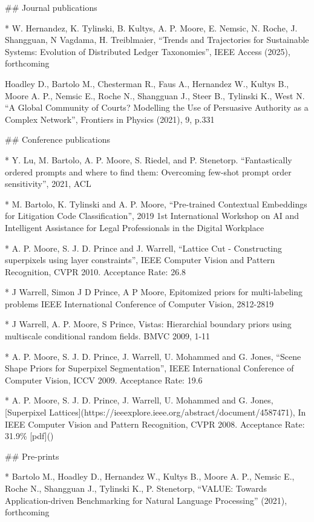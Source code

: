 
## Journal publications 

* W. Hernandez, K. Tylinski, B. Kultys, A. P. Moore,  E. Nemsic,  N. Roche, J. Shangguan, N Vagdama, H. Treiblmaier,  “Trends and Trajectories for Sustainable Systems: Evolution of Distributed Ledger Taxonomies”, IEEE Access (2025), forthcoming

Hoadley D., Bartolo M., Chesterman R., Faus A., Hernandez W., Kultys B., Moore A. P., Nemsic E., Roche N., Shangguan J., Steer B., Tylinski K., West N. “A Global Community of Courts? Modelling the Use of Persuasive Authority as a Complex Network”, Frontiers in Physics (2021), 9, p.331 

## Conference publications 

* Y. Lu, M. Bartolo, A. P. Moore, S. Riedel, and P. Stenetorp. “Fantastically ordered prompts and where to find them: Overcoming few-shot prompt order sensitivity”, 2021, ACL

* M. Bartolo, K. Tylinski and A. P. Moore, “Pre-trained Contextual Embeddings for Litigation Code Classification”, 2019 1st International Workshop on AI and Intelligent Assistance for Legal Professionals in the Digital Workplace

* A. P. Moore, S. J. D. Prince and J. Warrell, “Lattice Cut - Constructing superpixels using layer constraints”, IEEE Computer Vision and Pattern Recognition, CVPR 2010. Acceptance Rate: 26.8%

* J Warrell, Simon J D Prince, A P Moore, Epitomized priors for multi-labeling problems 
IEEE International Conference of Computer Vision, 2812-2819

* J Warrell, A. P. Moore, S Prince, Vistas: Hierarchial boundary priors using multiscale conditional random fields. BMVC 2009, 1-11

* A. P. Moore, S. J. D. Prince, J. Warrell, U. Mohammed and G. Jones, “Scene Shape Priors for Superpixel Segmentation”, IEEE International Conference of Computer Vision, ICCV 2009. Acceptance Rate: 19.6%

* A. P. Moore, S. J. D. Prince, J. Warrell, U. Mohammed and G. Jones, [Superpixel Lattices](https://ieeexplore.ieee.org/abstract/document/4587471), In IEEE Computer Vision and Pattern Recognition, CVPR 2008. Acceptance Rate: 31.9\% [pdf]()


## Pre-prints 

* Bartolo M., Hoadley D., Hernandez W., Kultys B., Moore A. P., Nemsic E., Roche N., Shangguan J., Tylinski K., P. Stenetorp, “VALUE: Towards Application-driven Benchmarking for Natural Language Processing” (2021), forthcoming


